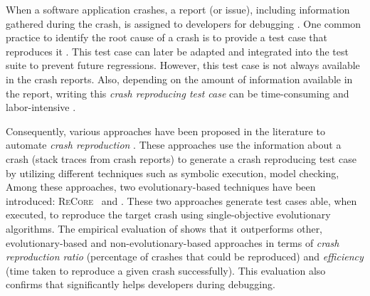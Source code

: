 
When a software application crashes, a report (or issue), including information gathered during the crash, is assigned to developers for debugging \cite{white2015}. One common practice to identify the root cause of a crash is to provide a test case that reproduces it \cite{Zeller2009}. This test case can later be adapted and integrated into the test suite to prevent future regressions. However, this test case is not always available in the crash reports. Also, depending on the amount of information available in the report, writing this \emph{crash reproducing test case} can be time-consuming and labor-intensive \cite{Soltani2018a}.

Consequently, various approaches have been proposed in the literature to automate \emph{crash reproduction} \cite{Chen2015, jin2012bugredux, Xuan2015, Nayrolles2017, nayrolles2015jcharming, BPT17concrash, Rossler2013, Soltani2018a}.
These approaches use the information about a crash (\eg stack traces from crash reports) to generate a crash reproducing test case by utilizing different techniques such as symbolic execution, model checking, \etc
Among these approaches, two evolutionary-based techniques have been introduced: \textsc{ReCore}~\cite{Rossler2013} and \evocrash \cite{Soltani2018a}. These two approaches generate test cases able, when executed, to reproduce the target crash using single-objective evolutionary algorithms. %
The empirical evaluation of \evocrash \cite{Soltani2018a} shows that it outperforms other, evolutionary-based and non-evolutionary-based approaches in terms of \emph{crash reproduction ratio} (percentage of crashes that could be reproduced) and \emph{efficiency} (time taken to reproduce a given crash successfully). This evaluation also confirms that \evocrash significantly helps developers during debugging.

